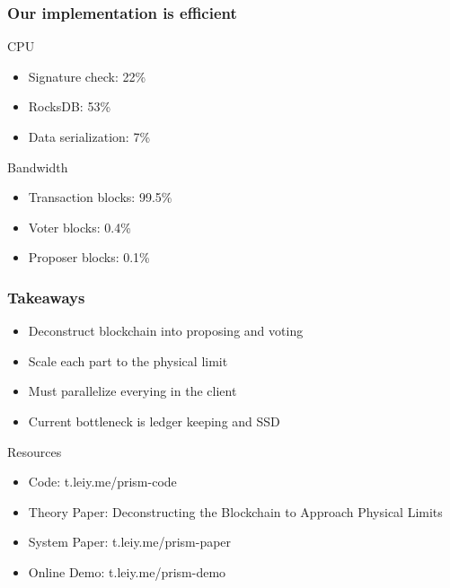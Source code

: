 \documentclass[aspectratio=169]{beamer}
\begin{document}
\begin{frame}
    \frametitle{Our implementation is efficient}
    \begin{block}{CPU}
    \begin{itemize}
        \item Signature check: 22\%
        \item RocksDB: 53\%
        \item Data serialization: 7\%
    \end{itemize}
    \end{block}
    \begin{block}{Bandwidth}
    \begin{itemize}
        \item Transaction blocks: 99.5\%
        \item Voter blocks: 0.4\%
        \item Proposer blocks: 0.1\%
    \end{itemize}
    \end{block}
\end{frame}

\begin{frame}
    \frametitle{Takeaways}
    \begin{block}{}
    \begin{itemize}
        \item Deconstruct blockchain into \alert{proposing} and \alert{voting}
        \item Scale each part to the physical limit
        \item Must parallelize everying in the client
        \item Current bottleneck is ledger keeping and SSD
    \end{itemize}
    \end{block}
    \begin{block}{Resources}
    \begin{itemize}
        \item Code: t.leiy.me/prism-code
        \item Theory Paper: Deconstructing the Blockchain to Approach Physical Limits
        \item System Paper: t.leiy.me/prism-paper
        \item Online Demo: t.leiy.me/prism-demo
    \end{itemize}
    \end{block}
\end{frame}
\end{document}
